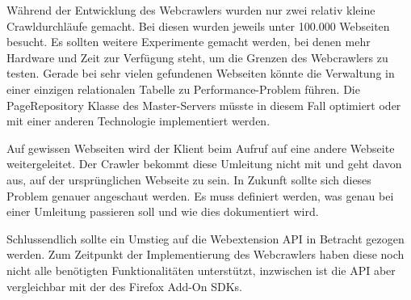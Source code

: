 Während der Entwicklung des Webcrawlers wurden nur zwei relativ kleine Crawldurchläufe gemacht. Bei diesen wurden jeweils unter 100.000 Webseiten besucht. Es sollten weitere Experimente gemacht werden, bei denen mehr Hardware und Zeit zur Verfügung steht, um die Grenzen des Webcrawlers zu testen. Gerade bei sehr vielen gefundenen Webseiten könnte die Verwaltung in einer einzigen relationalen Tabelle zu Performance-Problem führen. Die PageRepository Klasse des Master-Servers müsste in diesem Fall optimiert oder mit einer anderen Technologie implementiert werden. 

Auf gewissen Webseiten wird der Klient beim Aufruf auf eine andere Webseite weitergeleitet. Der Crawler bekommt diese Umleitung nicht mit und geht davon aus, auf der ursprünglichen Webseite zu sein. In Zukunft sollte sich dieses Problem genauer angeschaut werden. Es muss definiert werden, was genau bei einer Umleitung passieren soll und wie dies dokumentiert wird.

Schlussendlich sollte ein Umstieg auf die Webextension API in Betracht gezogen werden. Zum Zeitpunkt der Implementierung des Webcrawlers haben diese noch nicht alle benötigten Funktionalitäten unterstützt, inzwischen ist die API aber vergleichbar mit der des Firefox Add-On SDKs.




